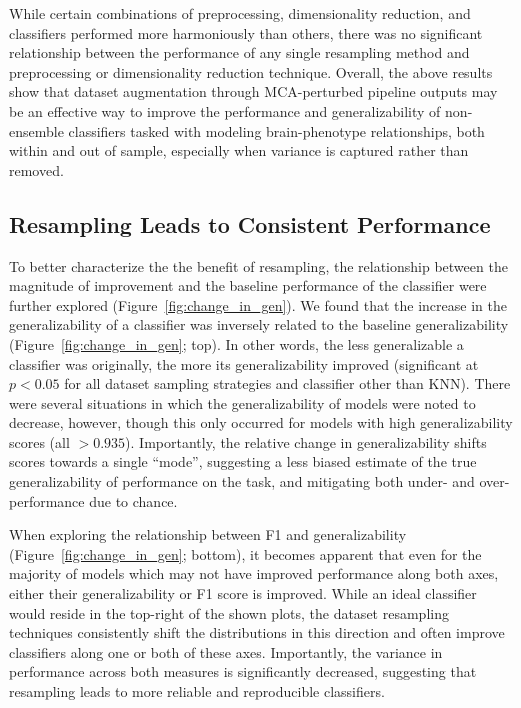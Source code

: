 \documentclass[10pt]{SelfArx} %
\begin{document}
While certain combinations of preprocessing, dimensionality reduction, and classifiers performed more harmoniously than
others, there was no significant relationship between the performance of any single resampling method and preprocessing
or dimensionality reduction technique. Overall, the above results show that dataset augmentation through MCA-perturbed
pipeline outputs may be an effective way to improve the performance and generalizability of non-ensemble classifiers
tasked with modeling brain-phenotype relationships, both within and out of sample, especially when variance is captured
rather than removed.

\subsection*{Resampling Leads to Consistent Performance}

To better characterize the the benefit of resampling, the relationship between the magnitude of improvement and the
baseline performance of the classifier were further explored (Figure~\ref{fig:change_in_gen}). We found that the
increase in the generalizability of a classifier was inversely related to the baseline generalizability
(Figure~\ref{fig:change_in_gen}; top). In other words, the less generalizable a classifier was originally, the more its
generalizability improved (significant at $p < 0.05$ for all dataset sampling strategies and classifier other than
KNN). There were several situations in which the generalizability of models were noted to decrease, however, though
this only occurred for models with high generalizability scores (all $>0.935$). Importantly, the relative change in
generalizability shifts scores towards a single ``mode'', suggesting a less biased estimate of the true
generalizability of performance on the task, and mitigating both under- and over-performance due to chance.

When exploring the relationship between F1 and generalizability (Figure~\ref{fig:change_in_gen}; bottom), it becomes
apparent that even for the majority of models which may not have improved performance along both axes, either their
generalizability or F1 score is improved. While an ideal classifier would reside in the top-right of the shown plots,
the dataset resampling techniques consistently shift the distributions in this direction and often improve classifiers
along one or both of these axes. Importantly, the variance in performance across both measures is significantly
decreased, suggesting that resampling leads to more reliable and reproducible classifiers.
\end{document}
